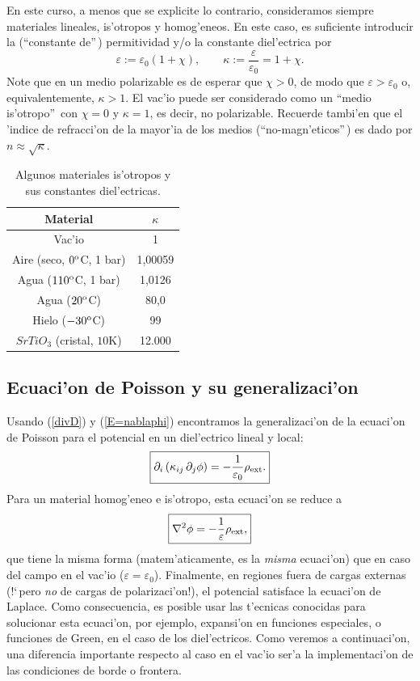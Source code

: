 En este curso, a menos que se explicite lo contrario, consideramos siempre
materiales lineales, is'otropos y homog'eneos. En este caso, es suficiente
introducir la (``constante de''\,) permitividad y/o la constante diel'ectrica
por
\begin{equation}
\varepsilon:=\varepsilon_0(1+\chi), \qquad
\kappa:=\frac{\varepsilon}{\varepsilon_0}=1+\chi.
\end{equation}
Note que en un medio polarizable es de esperar que $\chi>0$, de modo que
$\varepsilon>\varepsilon_0$ o, equivalentemente, $\kappa>1$. El vac'io puede ser
considerado como un ``medio is'otropo''\, con $\chi=0$ y $\kappa=1$, es decir, no polarizable.
Recuerde tambi'en que el 'indice de refracci'on de la mayor'ia de los medios
(``no-magn'eticos''\,) es dado por $n\approx\sqrt{\kappa}$.
\begin{table}[!h]
\begin{center}
\begin{tabular}{c|c}
Material &   $\kappa$ \\ \hline\hline
Vac'io & 1 \\
Aire (seco, $0^{\rm o}$C, 1 bar)  & 1,00059 \\
Agua ($110^{\rm o}$C, 1 bar)  & 1,0126 \\
Agua ($20^{\rm o}$C) &  80,0 \\
Hielo ($-30^{\rm o}$C) &  99 \\
$SrTiO_3$ (cristal, $10$K)  & 12.000 \\
\end{tabular}
\caption{Algunos materiales is'otropos y sus constantes diel'ectricas.}
\end{center}
\end{table}

\subsection{Ecuaci'on de Poisson y su generalizaci'on}

Usando (\ref{divD}) y (\ref{E=nablaphi}) encontramos la generalizaci'on de la
ecuaci'on de Poisson para el potencial en un diel'ectrico lineal y local:
\begin{equation}
 \boxed{\partial_i\left(\kappa_{ij}\,\partial_j \phi\right)
=-\frac{1}{\varepsilon_0}\rho_{\rm ext}.}
\end{equation}
Para un material homog'eneo e is'otropo, esta ecuaci'on se reduce a
\begin{equation}\label{Poissond}
 \boxed{\nabla^2\phi=-\frac{1}{\varepsilon}\rho_{\rm ext},}
\end{equation}
que tiene la misma forma (matem'aticamente, es la \textit{misma} ecuaci'on) que
en caso del campo en el vac'io ($\varepsilon=\varepsilon_0$). Finalmente, en
regiones fuera de cargas externas (!`\,pero \textit{no} de cargas de
polarizaci'on!), el potencial satisface la ecuaci'on de Laplace. Como
consecuencia, es posible usar las t'ecnicas conocidas para solucionar esta ecuaci'on, por ejemplo, expansi'on en funciones especiales, o funciones de Green, en el caso de los diel'ectricos.
Como veremos a continuaci'on, una diferencia importante respecto al caso en el
vac'io ser'a la implementaci'on de las condiciones de borde o frontera.


